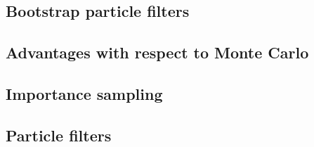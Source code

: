 \documentclass{article}
\begin{document}
\subsection*{Bootstrap particle filters}

\subsection*{Advantages with respect to Monte Carlo}

\subsection*{Importance sampling}

\subsection*{Particle filters}
\end{document}
